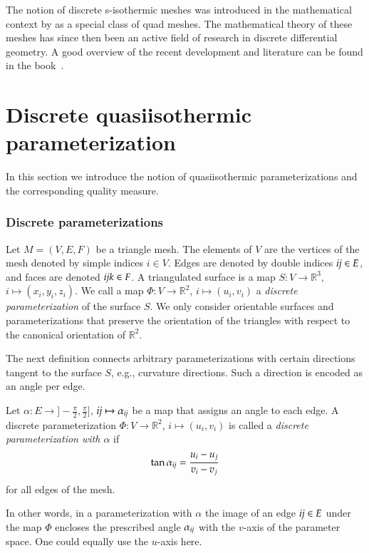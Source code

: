 \documentclass[Thesis.tex]{subfiles}
\begin{document}
The notion of discrete s-isothermic meshes was introduced in the mathematical
context by \cite{BobenkoP1996} as a special class of quad meshes.
The mathematical theory of these meshes has since then been an active field of
research in discrete differential geometry. A good overview of the recent
development and literature can be found in the book~\cite{BobenkoSuris2008}. 


\section{Discrete quasiisothermic parameterization}
\label{sec:parametrization}
In this section we introduce the notion of quasiisothermic parameterizations and the
corresponding quality measure.

\subsubsection{Discrete parameterizations}
Let $M=(V,E,F)$ be a triangle mesh. The elements of $V$ are the vertices of the
mesh denoted by simple indices $i\in V$. Edges are denoted by double
indices $\mathrm{\it{ij}}\in E$, and faces are denoted $\mathrm{\it{ijk}}\in F$. A triangulated surface is
a map $S:V\to \mathbb R^3$, $i \mapsto (x_i, y_i, z_i)$.
We call a map $\Phi: V \to \mathbb R^2$, $i \mapsto (u_i,v_i)$ a \emph{discrete
parameterization} of the surface $S$. We only consider orientable surfaces and
parameterizations that preserve the orientation of the triangles with respect to
the canonical orientation of $\mathbb R^2$. 

The next definition connects arbitrary parameterizations with certain directions
tangent to the surface $S$, e.g., curvature directions. Such a direction is encoded as 
an angle per edge. 
\begin{definition}
Let $\alpha : E \to ]-\frac{\pi}{2},\frac{\pi}{2}]$, $\mathrm{\it{ij}} \mapsto \alpha_{\mathrm{\it{ij}}}$
be a map that assigns an angle to each edge. A discrete parameterization 
$\Phi: V\to \mathbb R^2$, $i \mapsto (u_i,v_i)$ is called a \emph{discrete
parameterization with $\alpha$} if
\begin{equation}
\label{eq:isothermic}
\tan \alpha_{\mathrm{\it{ij}}} = \frac{u_i - u_j}{v_i - v_j}
\end{equation}
for all edges of the mesh.
\end{definition}
In other words, in a parameterization with $\alpha$ the image of an edge $\mathrm{\it{ij}}\in
E$ under the map $\Phi$ encloses the prescribed angle $\alpha_{\mathrm{\it{ij}}}$ with the
$v$-axis of the parameter space. One could equally use the $u$-axis here.
\end{document}
